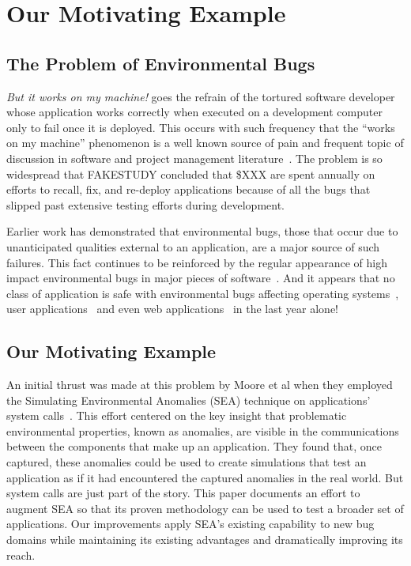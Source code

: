 \section{Our Motivating Example}
\label{SEC:background}

\subsection{The Problem of Environmental Bugs}

\textit{But it works on my machine!} goes the refrain of the tortured
software developer whose application works correctly when executed on a
development computer only to fail once it is deployed.  This occurs with
such frequency that the ``works on my machine'' phenomenon is a well known
source of pain
and frequent topic of discussion
in software and project management
literature~\cite{notreal}.
The problem is so widespread
that FAKESTUDY concluded
that \$XXX are spent annually on efforts to
recall,
fix,
and re-deploy applications
because of all the bugs
that slipped past extensive testing efforts
during development.

Earlier work has demonstrated that environmental bugs, those that occur due
to unanticipated qualities external to an application, are a major source
of such failures.  This fact continues to be reinforced by the regular
appearance of high impact environmental bugs in major pieces of
software~\cite{devzeroroot}.  And it appears that no class of application
is safe with environmental bugs affecting operating systems~\cite{bad},
user applications~\cite{bad} and even web applications~\cite{bad} in the
last year alone!

\subsection{Our Motivating Example}

An initial thrust was made at this problem by Moore et al
when they employed
the Simulating Environmental Anomalies (SEA) technique
on applications' system calls~\cite{crashsim}.
This effort centered on the key insight
that problematic
environmental properties,
known as anomalies, are visible in the
communications between the components that make up an application.
They found that,
once captured,
these anomalies
could be
used to create simulations
that test
an application as if
it had encountered the captured anomalies
in the real world.
But system calls are just part of the story.
This paper documents an effort to augment SEA
so that its proven methodology
can be used to test a broader set of applications.
Our improvements
apply SEA's existing capability
to new bug domains
while maintaining its existing advantages and
dramatically
improving its reach.


